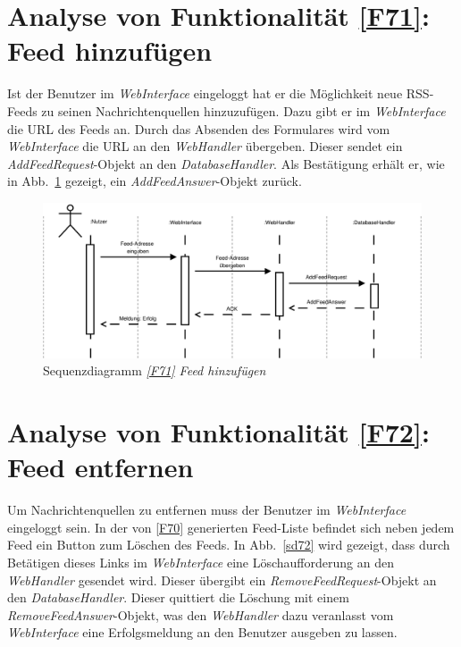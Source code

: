 \FloatBarrier

\section{Analyse von Funktionalität \ref{F71}: Feed hinzufügen}

Ist der Benutzer im \textit{WebInterface} eingeloggt hat er die Möglichkeit neue
RSS-Feeds zu seinen Nachrichtenquellen hinzuzufügen. Dazu gibt er im
\textit{WebInterface} die URL des Feeds an. Durch das Absenden des Formulares
wird vom \textit{WebInterface} die URL an den \textit{WebHandler} übergeben.
Dieser sendet ein \textit{AddFeedRequest}-Objekt an den
\textit{DatabaseHandler}. Als Bestätigung erhält er, wie in Abb.~\ref{sd71}
gezeigt, ein \textit{AddFeedAnswer}-Objekt zurück.

\begin{figure}[h]
\centering
\includegraphics[width=1\textwidth]{Systementwurf/02_produktfunktionsanalyse/f710}
\caption{Sequenzdiagramm \textit{\ref{F71} Feed hinzufügen}
\label{sd71}}
\end{figure}


\section{Analyse von Funktionalität \ref{F72}: Feed entfernen}

Um Nachrichtenquellen zu entfernen muss der Benutzer im \textit{WebInterface}
eingeloggt sein. In der von \ref{F70} generierten Feed-Liste befindet sich neben
jedem Feed ein Button zum Löschen des Feeds. In Abb.~\ref{sd72} wird gezeigt,
dass durch Betätigen dieses Links im \textit{WebInterface} eine
Löschaufforderung an den \textit{WebHandler} gesendet wird. Dieser übergibt ein
\textit{RemoveFeedRequest}-Objekt an den \textit{DatabaseHandler}. Dieser
quittiert die Löschung mit einem \textit{RemoveFeedAnswer}-Objekt, was den
\textit{WebHandler} dazu veranlasst vom \textit{WebInterface} eine
Erfolgsmeldung an den Benutzer ausgeben zu lassen.

